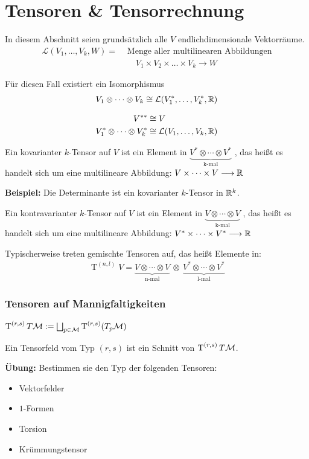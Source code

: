 \section{Tensoren \& Tensorrechnung}
In diesem Abschnitt seien grundsätzlich alle $V$ endlichdimensionale Vektorräume. \\
\begin{align*}
\mathcal{L}(V_1,\dots, V_k, W) = &\text{ Menge aller multilinearen Abbildungen} \\
&\phantom{ = } V_1 \times V_2 \times \dots \times V_k \longrightarrow W
\end{align*}

\begin{satz}
Für diesen Fall existiert ein Isomorphismus
\begin{align*}
V_1 \otimes \cdots \otimes V_k \cong \mathcal{L}(V_1^*, \dots, V_k^*, \mathbb{R})
\end{align*}
\end{satz}

\begin{bem}
\begin{align*}
V^{**} &\cong V \\
V_1^* \otimes \cdots \otimes V_k^* &\cong \mathcal{L}(V_1, \dots, V_k, \mathbb{R})
\end{align*}
\end{bem}

\begin{defs}
Ein kovarianter $k$-Tensor auf $V$ ist ein Element in $\underbrace{V^*\otimes\cdots\otimes V^*}_{\text{k-mal}}$ , das heißt es handelt sich um eine multilineare Abbildung: $ V \times \cdots \times V \longrightarrow \mathbb{R}$
\end{defs}
\textbf{Beispiel:} Die Determinante ist ein kovarianter $k$-Tensor in $\mathbb{R}^k$.
\begin{defs}
Ein kontravarianter $k$-Tensor auf $V$ ist ein Element in $\underbrace{V\otimes\cdots\otimes V}_{\text{k-mal}}$ , das heißt es handelt sich um eine multilineare Abbildung: $ V^*\times \cdots \times V^* \longrightarrow \mathbb{R}$
\end{defs}
Typischerweise treten gemischte Tensoren auf, das heißt Elemente in:
\begin{align*}
\operatorname{T}^{(n, l)}V = \underbrace{V\otimes\cdots\otimes V}_{\text{n-mal}} \ \otimes \  \underbrace{V^*\otimes\cdots\otimes V^*}_{\text{l-mal}}
\end{align*}

\subsubsection*{Tensoren auf Mannigfaltigkeiten}
$\operatorname{T}^{(r, s)}T\mathcal{M}  := \bigsqcup_{p\in\mathcal{M}} \operatorname{T}^{(r, s)}(T_p\mathcal{M})$

\begin{defs}
Ein Tensorfeld vom Typ $(r,s)$ ist ein Schnitt von $\operatorname{T}^{(r, s)}T\mathcal{M}$.
\end{defs}

\textbf{Übung:} Bestimmen sie den Typ der folgenden Tensoren:
\begin{itemize}
\item Vektorfelder
\item $1$-Formen
\item Torsion
\item Krümmungstensor
\end{itemize}